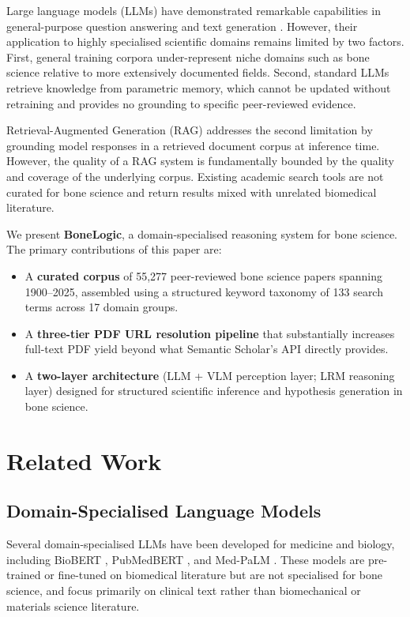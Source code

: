 \documentclass[12pt, a4paper]{article}
\begin{document}
Large language models (LLMs) have demonstrated remarkable capabilities in general-purpose
question answering and text generation \cite{TODO}. However, their application to highly
specialised scientific domains remains limited by two factors. First, general training
corpora under-represent niche domains such as bone science relative to more extensively
documented fields. Second, standard LLMs retrieve knowledge from parametric memory,
which cannot be updated without retraining and provides no grounding to specific
peer-reviewed evidence.

Retrieval-Augmented Generation (RAG) \cite{TODO} addresses the second limitation by
grounding model responses in a retrieved document corpus at inference time. However,
the quality of a RAG system is fundamentally bounded by the quality and coverage of
the underlying corpus. Existing academic search tools are not curated for bone science
and return results mixed with unrelated biomedical literature.

We present \textbf{BoneLogic}, a domain-specialised reasoning system for bone science.
The primary contributions of this paper are:

\begin{itemize}
    \item A \textbf{curated corpus} of 55,277 peer-reviewed bone science papers spanning
          1900--2025, assembled using a structured keyword taxonomy of 133 search terms
          across 17 domain groups.
    \item A \textbf{three-tier PDF URL resolution pipeline} that substantially increases
          full-text PDF yield beyond what Semantic Scholar's API directly provides.
    \item A \textbf{two-layer architecture} (LLM + VLM perception layer; LRM reasoning layer)
          designed for structured scientific inference and hypothesis generation in bone science.
\end{itemize}

\section{Related Work}
\label{sec:related}


\subsection{Domain-Specialised Language Models}
Several domain-specialised LLMs have been developed for medicine and biology,
including BioBERT \cite{TODO}, PubMedBERT \cite{TODO}, and Med-PaLM \cite{TODO}.
These models are pre-trained or fine-tuned on biomedical literature but are not
specialised for bone science, and focus primarily on clinical text rather than
biomechanical or materials science literature.
\end{document}
